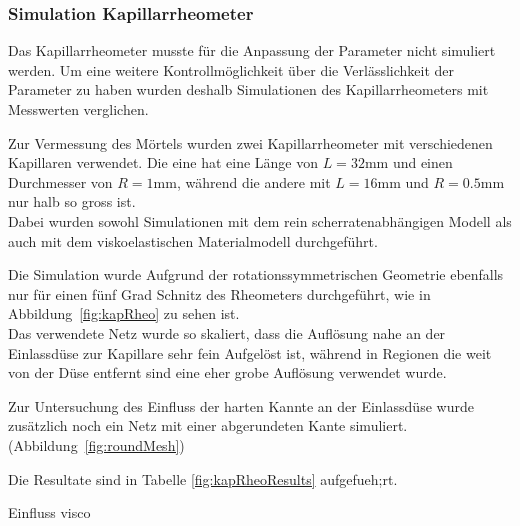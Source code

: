 \subsubsection{Simulation Kapillarrheometer}
Das Kapillarrheometer musste für die Anpassung der Parameter nicht simuliert werden. Um eine weitere Kontrollmöglichkeit über die Verlässlichkeit der Parameter zu haben wurden deshalb Simulationen des Kapillarrheometers mit Messwerten verglichen.

Zur Vermessung des Mörtels wurden zwei Kapillarrheometer mit verschiedenen Kapillaren verwendet. Die eine hat eine Länge von $L=32\mbox{mm}$ und einen Durchmesser von $R=1\mbox{mm}$, während die andere mit $L=16\mbox{mm}$ und $R=0.5\mbox{mm}$ nur halb so gross ist.\\
Dabei wurden sowohl Simulationen mit dem rein scherratenabhängigen Modell als auch mit dem viskoelastischen Materialmodell durchgeführt.

Die Simulation wurde Aufgrund der rotationssymmetrischen Geometrie ebenfalls nur für einen fünf Grad Schnitz  des Rheometers durchgeführt, wie in Abbildung~\ref{fig:kapRheo}  zu sehen ist.\\
Das verwendete Netz wurde so skaliert, dass die Auflösung nahe an der Einlassdüse zur Kapillare sehr fein Aufgelöst ist, während in Regionen die weit von der Düse entfernt sind eine eher grobe Auflösung verwendet wurde.

Zur Untersuchung des Einfluss der harten Kannte an der Einlassdüse wurde zusätzlich noch ein Netz mit einer abgerundeten Kante simuliert. (Abbildung~\ref{fig:roundMesh})  

Die Resultate sind in Tabelle \ref{fig:kapRheoResults} aufgefueh;rt.

\begin{todocontent}
    \1 Einfluss visco
\end{todocontent}
%
